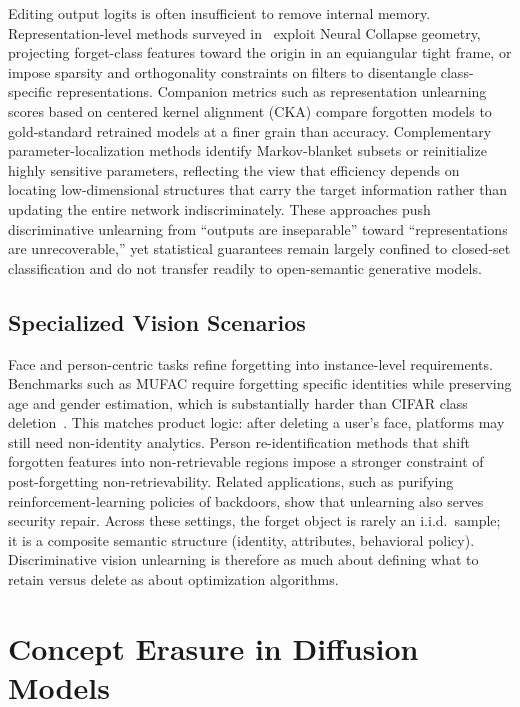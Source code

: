 \documentclass[10pt,twocolumn,letterpaper]{article}
\begin{document}
Editing output logits is often insufficient to remove internal memory. Representation-level methods surveyed in~\cite{safavigerdini2026} exploit Neural Collapse geometry, projecting forget-class features toward the origin in an equiangular tight frame, or impose sparsity and orthogonality constraints on filters to disentangle class-specific representations. Companion metrics such as representation unlearning scores based on centered kernel alignment (CKA) compare forgotten models to gold-standard retrained models at a finer grain than accuracy. Complementary parameter-localization methods identify Markov-blanket subsets or reinitialize highly sensitive parameters, reflecting the view that efficiency depends on locating low-dimensional structures that carry the target information rather than updating the entire network indiscriminately. These approaches push discriminative unlearning from ``outputs are inseparable'' toward ``representations are unrecoverable,'' yet statistical guarantees remain largely confined to closed-set classification and do not transfer readily to open-semantic generative models.

\subsection{Specialized Vision Scenarios}

Face and person-centric tasks refine forgetting into instance-level requirements. Benchmarks such as MUFAC require forgetting specific identities while preserving age and gender estimation, which is substantially harder than CIFAR class deletion~\cite{safavigerdini2026}. This matches product logic: after deleting a user's face, platforms may still need non-identity analytics. Person re-identification methods that shift forgotten features into non-retrievable regions impose a stronger constraint of post-forgetting non-retrievability. Related applications, such as purifying reinforcement-learning policies of backdoors, show that unlearning also serves security repair. Across these settings, the forget object is rarely an i.i.d.\ sample; it is a composite semantic structure (identity, attributes, behavioral policy). Discriminative vision unlearning is therefore as much about defining what to retain versus delete as about optimization algorithms.

\section{Concept Erasure in Diffusion Models}
\end{document}
